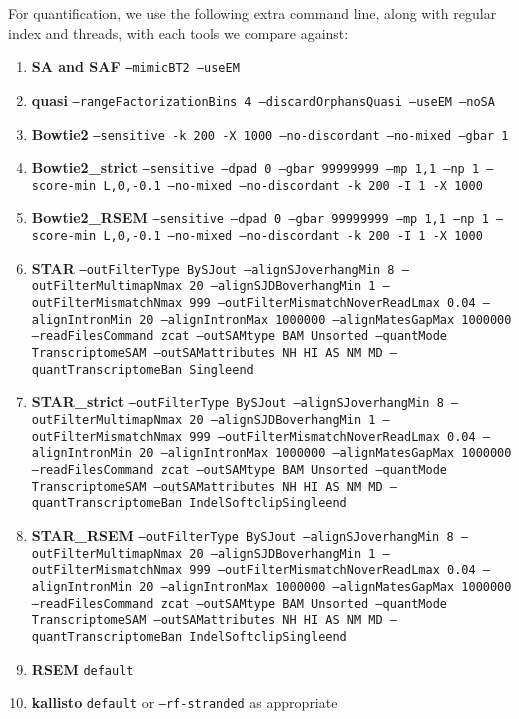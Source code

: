 For quantification, we use the following extra command line, along with regular
index and threads, with each tools we compare against:
\raggedright
\begin{enumerate}
	\item \textbf{SA and SAF} \texttt{--mimicBT2 --useEM}
	\item \textbf{quasi} \texttt{--rangeFactorizationBins 4 --discardOrphansQuasi --useEM --noSA}
	\item \textbf{Bowtie2} \texttt{--sensitive -k 200 -X 1000 --no-discordant --no-mixed --gbar 1}
	\item \textbf{Bowtie2\_strict} \texttt{--sensitive --dpad 0 --gbar 99999999 --mp 1,1
	  --np 1 --score-min L,0,-0.1 --no-mixed --no-discordant -k 200 -I 1 -X 1000}
	\item \textbf{Bowtie2\_RSEM} \texttt{--sensitive --dpad 0 --gbar 99999999 --mp 1,1
	  --np 1 --score-min L,0,-0.1 --no-mixed --no-discordant -k 200 -I 1 -X 1000}
	\item \textbf{STAR} \texttt{--outFilterType BySJout --alignSJoverhangMin 8 
	--outFilterMultimapNmax 20 --alignSJDBoverhangMin 1 --outFilterMismatchNmax 999
	--outFilterMismatchNoverReadLmax 0.04 --alignIntronMin 20 --alignIntronMax 1000000 
	--alignMatesGapMax 1000000 --readFilesCommand zcat --outSAMtype BAM Unsorted 
	--quantMode TranscriptomeSAM --outSAMattributes NH HI AS NM MD 
	--quantTranscriptomeBan Singleend}
	\item \textbf{STAR\_strict} \texttt{--outFilterType BySJout --alignSJoverhangMin 8 
	--outFilterMultimapNmax 20 --alignSJDBoverhangMin 1 --outFilterMismatchNmax 999
	--outFilterMismatchNoverReadLmax 0.04 --alignIntronMin 20 --alignIntronMax 1000000 
	--alignMatesGapMax 1000000 --readFilesCommand zcat --outSAMtype BAM Unsorted 
	--quantMode TranscriptomeSAM --outSAMattributes NH HI AS NM MD
	--quantTranscriptomeBan IndelSoftclipSingleend}
	\item \textbf{STAR\_RSEM} \texttt{--outFilterType BySJout --alignSJoverhangMin 8 
	--outFilterMultimapNmax 20 --alignSJDBoverhangMin 1 --outFilterMismatchNmax 999
	--outFilterMismatchNoverReadLmax 0.04 --alignIntronMin 20 --alignIntronMax 1000000 
	--alignMatesGapMax 1000000 --readFilesCommand zcat --outSAMtype BAM Unsorted 
	--quantMode TranscriptomeSAM --outSAMattributes NH HI AS NM MD
	--quantTranscriptomeBan IndelSoftclipSingleend}
	\item \textbf{RSEM} \texttt{default}
	\item \textbf{kallisto} \texttt{default} or \texttt{--rf-stranded} as appropriate
\end{enumerate}

